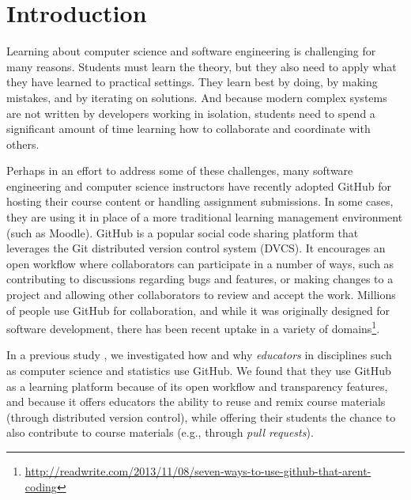 \section{Introduction}


Learning about computer science and software engineering is challenging for many reasons. Students must learn the theory, but they also need to apply what they have learned to practical settings. They learn best by doing, by making mistakes, and by iterating on solutions. And because modern complex systems are not written by developers working in isolation, students need to spend a significant amount of time learning how to collaborate and coordinate with others.

Perhaps in an effort to address some of these challenges, many software engineering and computer science instructors have recently adopted GitHub for hosting their course content or handling assignment submissions. In some cases, they are using it in place of a more traditional learning management environment (such as Moodle).
%
GitHub is a popular social code sharing platform that leverages the Git distributed version control system (DVCS). It encourages an open workflow where collaborators can participate in a number of ways, such as contributing to discussions regarding bugs and features, or making changes to a project and allowing other collaborators to review and accept the work. Millions of people use GitHub for collaboration, and while it was originally designed for software development, there has been recent uptake in a variety of domains\footnote{\url{http://readwrite.com/2013/11/08/seven-ways-to-use-github-that-arent-coding}}.

In a previous study \cite{zagalsky2015emergence}, we investigated how and why \emph{educators} in disciplines such as computer science and statistics use GitHub. We found that they use GitHub as a learning platform because of its open workflow and transparency features, and because it offers educators the ability to reuse and remix course materials (through distributed version control), while offering their students the chance to also contribute to course materials (e.g., through \emph{pull requests}).

